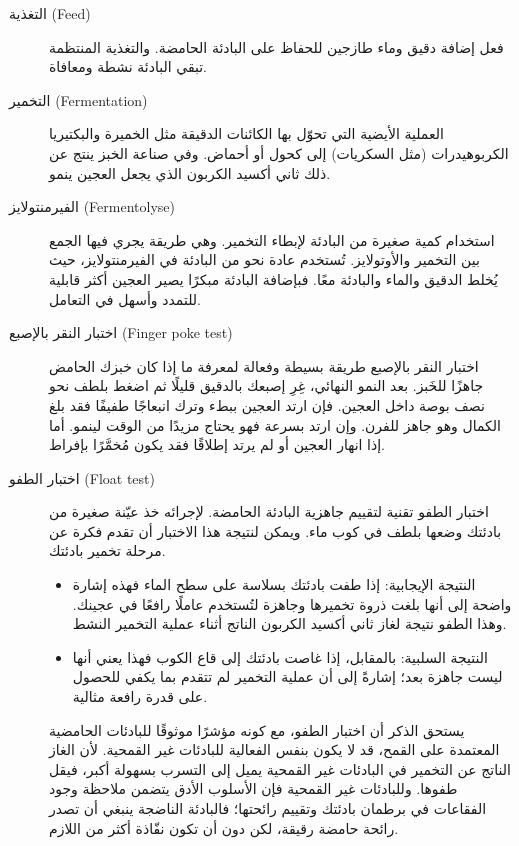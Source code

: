 \begin{description}
\item[التغذية \textenglish{(Feed)}]
فعل إضافة دقيق وماء طازجين للحفاظ على البادئة الحامضة. والتغذية المنتظمة تبقي البادئة نشطة ومعافاة.

\item[التخمير \textenglish{(Fermentation)}]
العملية الأيضية التي تحوّل بها الكائنات الدقيقة مثل الخميرة والبكتيريا الكربوهيدرات (مثل السكريات) إلى كحول أو أحماض. وفي صناعة الخبز ينتج عن ذلك ثاني أكسيد الكربون الذي يجعل العجين ينمو.

\item[الفيرمنتولايز \textenglish{(Fermentolyse)}]
استخدام كمية صغيرة من البادئة لإبطاء التخمير. وهي طريقة يجري فيها الجمع بين التخمير والأوتولايز. تُستخدم عادة نحو  من البادئة في الفيرمنتولايز، حيث يُخلط الدقيق والماء والبادئة معًا. فبإضافة البادئة مبكرًا يصير العجين أكثر قابلية للتمدد وأسهل في التعامل.

\item[اختبار النقر بالإصبع \textenglish{(Finger poke test)}]
اختبار النقر بالإصبع طريقة بسيطة وفعالة لمعرفة ما إذا كان خبزك الحامض جاهزًا للخَبز. بعد النمو النهائي، غِرِ إصبعك بالدقيق قليلًا ثم اضغط بلطف نحو نصف بوصة داخل العجين. فإن ارتد العجين ببطء وترك انبعاجًا طفيفًا فقد بلغ الكمال وهو جاهز للفرن. وإن ارتد بسرعة فهو يحتاج مزيدًا من الوقت لينمو. أما إذا انهار العجين أو لم يرتد إطلاقًا فقد يكون مُخمَّرًا بإفراط.

\item[اختبار الطفو \textenglish{(Float test)}]
اختبار الطفو تقنية لتقييم جاهزية البادئة الحامضة. لإجرائه خذ عيّنة صغيرة من بادئتك وضعها بلطف في كوب ماء. ويمكن لنتيجة هذا الاختبار أن تقدم فكرة عن مرحلة تخمير بادئتك.
\begin{itemize}
    \item[] النتيجة الإيجابية: إذا طفت بادئتك بسلاسة على سطح الماء فهذه إشارة واضحة إلى أنها بلغت ذروة تخميرها وجاهزة لتُستخدم عاملًا رافعًا في عجينك. وهذا الطفو نتيجة لغاز ثاني أكسيد الكربون الناتج أثناء عملية التخمير النشط.
    \item[] النتيجة السلبية: بالمقابل، إذا غاصت بادئتك إلى قاع الكوب فهذا يعني أنها ليست جاهزة بعد؛ إشارةً إلى أن عملية التخمير لم تتقدم بما يكفي للحصول على قدرة رافعة مثالية.
\end{itemize}
يستحق الذكر أن اختبار الطفو، مع كونه مؤشرًا موثوقًا للبادئات الحامضية المعتمدة على القمح، قد لا يكون بنفس الفعالية للبادئات غير القمحية. لأن الغاز الناتج عن التخمير في البادئات غير القمحية يميل إلى التسرب بسهولة أكبر، فيقل طفوها. وللبادئات غير القمحية فإن الأسلوب الأدق يتضمن ملاحظة وجود الفقاعات في برطمان بادئتك وتقييم رائحتها؛ فالبادئة الناضجة ينبغي أن تصدر رائحة حامضة رقيقة، لكن دون أن تكون نفّاذة أكثر من اللازم.


\end{description}

